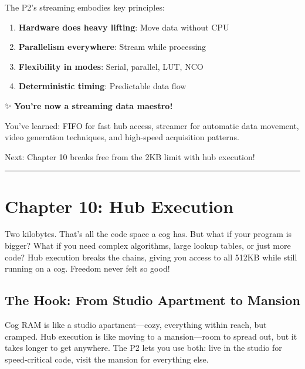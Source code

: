 \documentclass[11pt]{book}
\providecommand{\tightlist}{%
  \setlength{\itemsep}{0pt}\setlength{\parskip}{0pt}}
\begin{document}
The P2's streaming embodies key principles:

\begin{enumerate}
\def\labelenumi{\arabic{enumi}.}
\tightlist
\item
  \textbf{Hardware does heavy lifting}: Move data without CPU
\item
  \textbf{Parallelism everywhere}: Stream while processing
\item
  \textbf{Flexibility in modes}: Serial, parallel, LUT, NCO
\item
  \textbf{Deterministic timing}: Predictable data flow
\end{enumerate}

\begin{chapterend}
✨ \textbf{You're now a streaming data maestro!}

You've learned: FIFO for fast hub access, streamer for automatic data movement, video generation techniques, and high-speed acquisition patterns.

Next: Chapter 10 breaks free from the 2KB limit with hub execution!
\end{chapterend}

\begin{center}\rule{0.5\linewidth}{0.5pt}\end{center}

\hypertarget{chapter-10-hub-execution}{%
\section{Chapter 10: Hub Execution}\label{chapter-10-hub-execution}}

Two kilobytes. That's all the code space a cog has. But what if your
program is bigger? What if you need complex algorithms, large lookup
tables, or just more code? Hub execution breaks the chains, giving you
access to all 512KB while still running on a cog. Freedom never felt so
good!

\hypertarget{the-hook-from-studio-apartment-to-mansion}{%
\subsection{The Hook: From Studio Apartment to
Mansion}\label{the-hook-from-studio-apartment-to-mansion}}

Cog RAM is like a studio apartment---cozy, everything within reach, but
cramped. Hub execution is like moving to a mansion---room to spread out,
but it takes longer to get anywhere. The P2 lets you use both: live in
the studio for speed-critical code, visit the mansion for everything
else.
\end{document}
